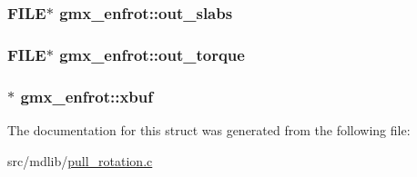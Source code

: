 \hypertarget{structgmx__enfrot_a6d0ff8951b1f6e3e13cc92a2afe264cd}{
\subsubsection[{out\-\_\-slabs}]{\setlength{\rightskip}{0pt plus 5cm}\-F\-I\-L\-E$\ast$ {\bf gmx\-\_\-enfrot\-::out\-\_\-slabs}}}\label{structgmx__enfrot_a6d0ff8951b1f6e3e13cc92a2afe264cd}
\hypertarget{structgmx__enfrot_a1b9f6d19f38a3ef925d4f7cc344a46d0}{
\subsubsection[{out\-\_\-torque}]{\setlength{\rightskip}{0pt plus 5cm}\-F\-I\-L\-E$\ast$ {\bf gmx\-\_\-enfrot\-::out\-\_\-torque}}}\label{structgmx__enfrot_a1b9f6d19f38a3ef925d4f7cc344a46d0}
\hypertarget{structgmx__enfrot_a99d0a60f25544436e59d07457e05811f}{
\subsubsection[{xbuf}]{$\ast$ {\bf gmx\-\_\-enfrot\-::xbuf}}}\label{structgmx__enfrot_a99d0a60f25544436e59d07457e05811f}


\-The documentation for this struct was generated from the following file\-:\begin{DoxyCompactItemize}
\item 
src/mdlib/\hyperlink{pull__rotation_8c}{pull\-\_\-rotation.\-c}\end{DoxyCompactItemize}
